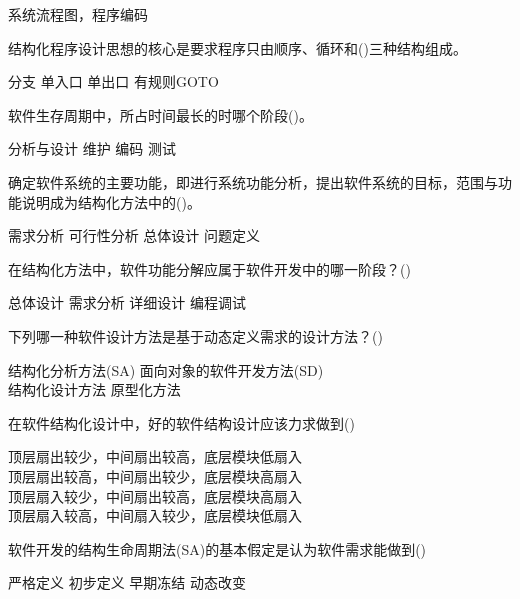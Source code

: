 \documentclass[answer]{exam}
\begin{document}
\begin{questions}
\begin{oneparchoices}
		\choice 系统流程图，程序编码
	\end{oneparchoices}
	\question 结构化程序设计思想的核心是要求程序只由顺序、循环和()三种结构组成。\\
	\begin{oneparchoices}
		\choice 分支
		\choice 单入口
		\choice 单出口
		\choice 有规则GOTO
	\end{oneparchoices}
	\question 软件生存周期中，所占时间最长的时哪个阶段()。\\
	\begin{oneparchoices}
		\choice 分析与设计
		\choice 维护
		\choice 编码
		\choice 测试
	\end{oneparchoices}
	\question 确定软件系统的主要功能，即进行系统功能分析，提出软件系统的目标，范围与功能说明成为结构化方法中的()。\\
	\begin{oneparchoices}
		\choice 需求分析
		\choice 可行性分析
		\choice 总体设计
		\choice 问题定义
	\end{oneparchoices}
	\question 在结构化方法中，软件功能分解应属于软件开发中的哪一阶段？()\\
	\begin{oneparchoices}
		\choice 总体设计
		\choice 需求分析
		\choice 详细设计
		\choice 编程调试
	\end{oneparchoices}
	\question 下列哪一种软件设计方法是基于动态定义需求的设计方法？()\\
	\begin{oneparchoices}
		\choice 结构化分析方法(SA)
		\choice 面向对象的软件开发方法(SD)\\
		\choice 结构化设计方法
		\choice 原型化方法
	\end{oneparchoices}
	\question 在软件结构化设计中，好的软件结构设计应该力求做到()\\
	\begin{oneparchoices}
		\choice 顶层扇出较少，中间扇出较高，底层模块低扇入\\
		\choice 顶层扇出较高，中间扇出较少，底层模块高扇入\\
		\choice 顶层扇入较少，中间扇出较高，底层模块高扇入\\
		\choice 顶层扇入较高，中间扇入较少，底层模块低扇入
	\end{oneparchoices}
	\question 软件开发的结构生命周期法(SA)的基本假定是认为软件需求能做到()\\
	\begin{oneparchoices}
		\choice 严格定义
		\choice 初步定义
		\choice 早期冻结
		\choice 动态改变
	\end{oneparchoices}

\end{questions}
\end{document}

